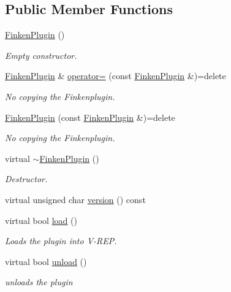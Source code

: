 \subsection*{Public Member Functions}
\begin{DoxyCompactItemize}
\item 
\hyperlink{classFinkenPlugin_a03dadda0b43081bce8e8db1223289fe1}{Finken\+Plugin} ()
\begin{DoxyCompactList}\small\item\em Empty constructor. \end{DoxyCompactList}\item 
\hyperlink{classFinkenPlugin}{Finken\+Plugin} \& \hyperlink{classFinkenPlugin_a3ebea1e19535491b5db16c7f43df8e79}{operator=} (const \hyperlink{classFinkenPlugin}{Finken\+Plugin} \&)=delete
\begin{DoxyCompactList}\small\item\em No copying the Finkenplugin. \end{DoxyCompactList}\item 
\hyperlink{classFinkenPlugin_a5f4bc33c0d0bb05ca4f78090c7a2fda9}{Finken\+Plugin} (const \hyperlink{classFinkenPlugin}{Finken\+Plugin} \&)=delete
\begin{DoxyCompactList}\small\item\em No copying the Finkenplugin. \end{DoxyCompactList}\item 
virtual \hyperlink{classFinkenPlugin_acb58d49ecbfaaffd014ddeb80606dc52}{$\sim$\+Finken\+Plugin} ()
\begin{DoxyCompactList}\small\item\em Destructor. \end{DoxyCompactList}\item 
virtual unsigned char \hyperlink{classFinkenPlugin_a046a229dfbc8185bac916ad2e49ec865}{version} () const 
\item 
virtual bool \hyperlink{classFinkenPlugin_afbe5d82635afe4b0c407de4724e8ee14}{load} ()
\begin{DoxyCompactList}\small\item\em Loads the plugin into V-\/\+R\+EP. \end{DoxyCompactList}\item 
virtual bool \hyperlink{classFinkenPlugin_ae9c984b362c6a828206fa6201291851c}{unload} ()
\begin{DoxyCompactList}\small\item\em unloads the plugin \end{DoxyCompactList}\item 

\end{DoxyCompactItemize}
